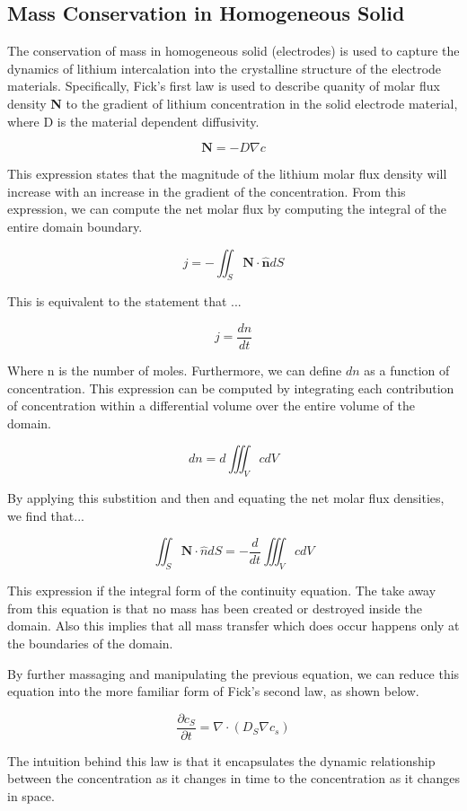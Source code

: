 \documentclass[lettersize,journal]{IEEEtran}
\begin{document}
\subsection{Mass Conservation in Homogeneous Solid}

The conservation of mass in homogeneous solid (electrodes) is used to capture the dynamics of lithium intercalation into the crystalline structure of the electrode materials. Specifically, Fick's first law is used to describe quanity of molar flux density \textbf{N} to the gradient of lithium concentration in the solid electrode material, where D is the material dependent diffusivity.

\[
\textbf{N} =  -D \nabla c
\]

This expression states that the magnitude of the lithium molar flux density will increase with an increase in the gradient of the concentration. From this expression, we can compute the net molar flux by computing the integral of the entire domain boundary.

\[
 j = -\iint_{S} \textbf{N} \cdot \hat{\textbf{n}}dS
\]

This is equivalent to the statement that ...

\[
j = \frac{dn}{dt}
\]

Where n is the number of moles. Furthermore, we can define $dn$ as a function of concentration. This expression can be computed by integrating each contribution of concentration within a differential volume over the entire volume of the domain.

\[
dn = d \iiint_V cdV
\]

By applying this substition and then and equating the net molar flux densities, we find that...

\[
\iint_S \textbf{N} \cdot \hat{n}dS = -\frac{d}{dt} \iiint_V c dV
\]

This expression if the integral form of the continuity equation. The take away from this equation is that no mass has been created or destroyed inside the domain. Also this implies that all mass transfer which does occur happens only at the boundaries of the domain.

By further massaging and manipulating the previous equation, we can reduce this equation into the more familiar form of Fick's second law, as shown below.

\[
\frac{\partial c_{S}}{\partial t} = \nabla \cdot \left( D_{S} \nabla c_{s} \right)
\]

The intuition behind this law is that it encapsulates the dynamic relationship between the concentration as it changes in time to the concentration as it changes in space.
\end{document}
